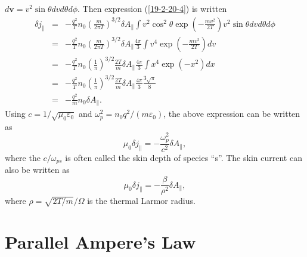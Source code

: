 \documentclass{article}
\begin{document}
$d\mathbf{v}= v^2 \sin \theta d v d \theta d \phi$. Then expression
(\ref{19-2-20-4}) is written
\begin{eqnarray}
  \delta j_{\parallel} & = & - \frac{q^2}{T} n_0 \left( \frac{m}{2 \pi T}
  \right)^{3 / 2} \delta A_{\parallel} \int v^2 \cos^2 \theta \exp \left( -
  \frac{m v^2}{2 T} \right) v^2 \sin \theta d v d \theta d \phi \nonumber\\
  & = & - \frac{q^2}{T} n_0 \left( \frac{m}{2 \pi T} \right)^{3 / 2} \delta
  A_{\parallel} \frac{4 \pi}{3} \int v^4 \exp \left( - \frac{m v^2}{2 T}
  \right) d v \nonumber\\
  & = & - \frac{q^2}{T} n_0 \left( \frac{1}{\pi} \right)^{3 / 2} \frac{2
  T}{m} \delta A_{\parallel} \frac{4 \pi}{3} \int x^4 \exp (- x^2) d x
  \nonumber\\
  & = & - \frac{q^2}{T} n_0 \left( \frac{1}{\pi} \right)^{3 / 2} \frac{2
  T}{m} \delta A_{\parallel} \frac{4 \pi}{3} \frac{3 \sqrt{\pi}}{8}
  \nonumber\\
  & = & - \frac{q^2}{m} n_0 \delta A_{\parallel} . 
\end{eqnarray}
Using $c = 1 / \sqrt{\mu_0 \varepsilon_0}$ and $\omega_p^2 = n_0 q^2 / (m
\varepsilon_0)$, the above expression can be written as
\begin{equation}
  \mu_0 \delta j_{\parallel} = - \frac{\omega_p^2}{c^2} \delta A_{\parallel},
\end{equation}
where the $c / \omega_{p s}$ is often called the skin depth of species ``s''.
The skin current can also be written as
\begin{equation}
  \mu_0 \delta j_{\parallel} = - \frac{\beta}{\rho^2} \delta A_{\parallel},
\end{equation}
where $\rho = \sqrt{2 T / m} / \Omega$ is the thermal Larmor radius.

\section{Parallel Ampere's Law}
\end{document}
